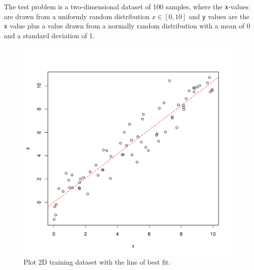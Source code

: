 The test problem is a two-dimensional dataset of 100 samples, where the \texttt{x}-values are drawn from a uniformly random distribution $x \in [0,10]$ and \texttt{y} values are the \texttt{x} value plus a value drawn from a normally random distribution with a mean of 0 and a standard deviation of 1.




\begin{figure}[htp]
\centering
\includegraphics[scale=0.45]{a_regression/ordinary_least_squares_regression_result.pdf}
\caption{Plot 2D training dataset with the line of best fit.}
\label{plot:ordinary_least_squares_regression_result}
\end{figure}



